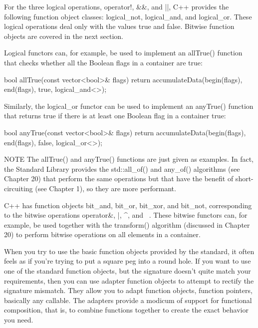 
For the three logical operations, operator!, \&\&, and ||, C++ provides the following function object classes: logical\_not, logical\_and, and logical\_or. These logical operations deal only with the values true and false. Bitwise function objects are covered in the next section.

Logical functors can, for example, be used to implement an allTrue() function that checks whether all the Boolean flags in a container are true:

\begin{cpp}
bool allTrue(const vector<bool>& flags)
{
    return accumulateData(begin(flags), end(flags), true, logical_and<>{});
}
\end{cpp}

Similarly, the logical\_or functor can be used to implement an anyTrue() function that returns true if there is at least one Boolean flag in a container true:

\begin{cpp}
bool anyTrue(const vector<bool>& flags)
{
    return accumulateData(begin(flags), end(flags), false, logical_or<>{});
}
\end{cpp}

\begin{myNotic}{NOTE}
The allTrue() and anyTrue() functions are just given as examples. In fact, the Standard Library provides the std::all\_of() and any\_of() algorithms (see Chapter 20) that perform the same operations but that have the benefit of short-circuiting (see Chapter 1), so they are more performant.
\end{myNotic}


C++ has function objects bit\_and, bit\_or, bit\_xor, and bit\_not, corresponding to the bitwise operations operator\&, |, \^{}, and ~. These bitwise functors can, for example, be used together with the transform() algorithm (discussed in Chapter 20) to perform bitwise operations on all elements in a container.


When you try to use the basic function objects provided by the standard, it often feels as if you’re trying to put a square peg into a round hole. If you want to use one of the standard function objects, but the signature doesn’t quite match your requirements, then you can use adapter function objects to attempt to rectify the signature mismatch. They allow you to adapt function objects, function pointers, basically any callable. The adapters provide a modicum of support for functional composition, that is, to combine functions together to create the exact behavior you need.

